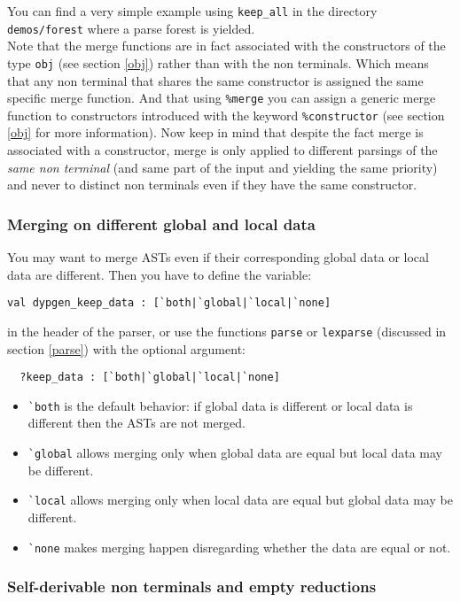 \documentclass[12pt]{article}
\begin{document}
{You can find a very simple example using \verb|keep_all| in the directory \texttt{demos/forest} where a parse forest is yielded.\\

Note that the merge functions are in fact associated with the constructors of the type \verb|obj| (see section \ref{obj}) rather than with the non terminals. Which means that any non terminal that shares the same constructor is assigned the same specific merge function. And that using \verb|%merge| you can assign a generic merge function to constructors introduced with the keyword \verb|%constructor| (see section \ref{obj} for more information). Now keep in mind that despite the fact merge is associated with a constructor, merge is only applied to different parsings of the \emph{same non terminal} (and same part of the input and yielding the same priority) and never to distinct non terminals even if they have the same constructor.

\subsubsection{Merging on different global and local data}\label{keep_data}

You may want to merge ASTs even if their corresponding global data or local data are different. Then you have to define the variable:
\begin{verbatim}
val dypgen_keep_data : [`both|`global|`local|`none]
\end{verbatim}
in the header of the parser, or use the functions \verb|parse| or \verb|lexparse| (discussed in section \ref{parse}) with the optional argument:
\begin{verbatim}
  ?keep_data : [`both|`global|`local|`none]
\end{verbatim}
\begin{itemize}
\item\verb|`both| is the default behavior: if global data is different or local data is different then the ASTs are not merged.
\item\verb|`global| allows merging only when global data are equal but local data may be different.
\item\verb|`local| allows merging only when local data are equal but global data may be different.
\item\verb|`none| makes merging happen disregarding whether the data are equal or not.
\end{itemize}

\subsubsection{Self-derivable non terminals and empty reductions}

}
\end{document}
